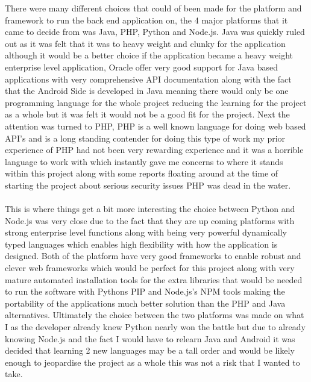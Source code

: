 There were many different choices that could of been made for the platform and framework to run the back end application on, the 4 major platforms that it came to decide from was Java, PHP, Python and Node.js. Java was quickly ruled out as it was felt that it was to heavy weight and clunky for the application although it would be a better choice if the application became a heavy weight enterprise level application, Oracle offer very good support for Java based applications with very comprehensive API documentation along with the fact that the Android Side is developed in Java meaning there would only be one programming language for the whole project reducing the learning for the project as a whole but it was felt it would not be a good fit for the project. Next the attention was turned to PHP, PHP is a well known language for doing web based API's and is a long standing contender for doing this type of work my prior experience of PHP had not been very rewarding experience and it was a horrible language to work with which instantly gave me concerns to where it stands within this project along with some reports floating around at the time of starting the project about serious security issues PHP was dead in the water.\\
\\
This is where things get a bit more interesting the choice between Python and Node.js was very close due to the fact that they are up coming platforms with strong enterprise level functions along with being very powerful dynamically typed languages which enables high flexibility with how the application is designed. Both of the platform have very good frameworks to enable robust and clever web frameworks which would be perfect for this project along with very mature automated installation tools for the extra libraries that would be needed to run the software with Pythons PIP and Node.js's NPM tools making the portability of the applications much better solution than the PHP and Java alternatives. Ultimately the choice between the two platforms was made on what I as the developer already knew Python nearly won the battle but due to already knowing Node.js and the fact I would have to relearn Java and Android it was decided that learning 2 new languages may be a tall order and would be likely enough to jeopardise the project as a whole this was not a risk that I wanted to take.\\
\\
